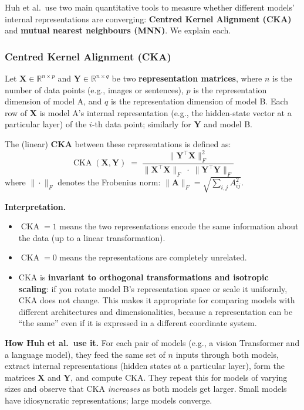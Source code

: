 \documentclass[11pt, a4paper]{article}
\begin{document}
Huh et al.\ use two main quantitative tools to measure whether different
models' internal representations are converging: \textbf{Centred Kernel
Alignment (CKA)} and \textbf{mutual nearest neighbours (MNN)}. We explain
each.

\subsubsection{Centred Kernel Alignment (CKA)}

\begin{definition}[title={Centred Kernel Alignment}]
Let $\mathbf{X} \in \mathbb{R}^{n \times p}$ and $\mathbf{Y} \in
\mathbb{R}^{n \times q}$ be two \textbf{representation matrices}, where
$n$ is the number of data points (e.g., images or sentences), $p$ is the
representation dimension of model A, and $q$ is the representation
dimension of model B. Each row of $\mathbf{X}$ is model A's internal
representation (e.g., the hidden-state vector at a particular layer) of
the $i$-th data point; similarly for $\mathbf{Y}$ and model B.

The (linear) \textbf{CKA} between these representations is defined as:
\[
\operatorname{CKA}(\mathbf{X}, \mathbf{Y})
\;=\; \frac{\|\mathbf{Y}^\top \mathbf{X}\|_F^2}
  {\|\mathbf{X}^\top \mathbf{X}\|_F \;\cdot\;
   \|\mathbf{Y}^\top \mathbf{Y}\|_F}
\]
where $\|\cdot\|_F$ denotes the Frobenius norm:
$\|\mathbf{A}\|_F = \sqrt{\sum_{i,j} A_{ij}^2}$.
\end{definition}

\textbf{Interpretation.}
\begin{itemize}[leftmargin=2em]
  \item $\operatorname{CKA} = 1$ means the two representations encode
    the same information about the data (up to a linear transformation).
  \item $\operatorname{CKA} = 0$ means the representations are completely
    unrelated.
  \item CKA is \textbf{invariant to orthogonal transformations and
    isotropic scaling}: if you rotate model B's representation space or
    scale it uniformly, CKA does not change. This makes it appropriate
    for comparing models with different architectures and dimensionalities,
    because a representation can be ``the same'' even if it is expressed in
    a different coordinate system.
\end{itemize}

\textbf{How Huh et al.\ use it.} For each pair of models (e.g., a vision
Transformer and a language model), they feed the same set of $n$ inputs
through both models, extract internal representations (hidden states at a
particular layer), form the matrices $\mathbf{X}$ and $\mathbf{Y}$, and
compute CKA. They repeat this for models of varying sizes and observe
that CKA \emph{increases} as both models get larger. Small models have
idiosyncratic representations; large models converge.
\end{document}
